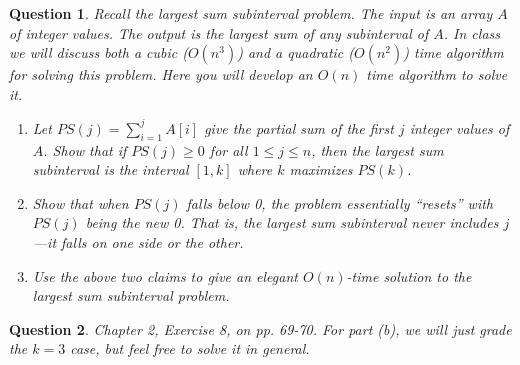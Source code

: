 \documentclass[11pt]{article}
\newtheorem{question}{Question}
\begin{document}
\begin{question}
Recall the {\em largest sum subinterval} problem.  The input is an array $A$ of integer values.  The output is the largest sum of any subinterval of $A$.  In class we will discuss both a cubic ($O(n^{3})$) and a quadratic ($O(n^{2})$) time algorithm for solving this problem.  Here you will develop an $O(n)$ time algorithm to solve it.
\begin{enumerate}
	\item Let $PS(j) = \sum_{i=1}^{j} A[i]$ give the partial sum of the first $j$ integer values of $A$.  Show that if $PS(j) \geq 0$ for all $1 \leq j \leq n$, then the largest sum subinterval is the interval $[1,k]$ where $k$ maximizes $PS(k)$.
	\item Show that when $PS(j)$ falls below 0, the problem essentially ``resets''  with $PS(j)$ being the new 0.  That is, the largest sum subinterval never includes $j$---it falls on one side or the other.
	\item Use the above two claims to give an elegant $O(n)$-time solution to the largest sum subinterval problem.
\end{enumerate}
\end{question}

\begin{question}
Chapter 2, Exercise 8, on pp. 69-70.  For part (b), we will just grade the $k=3$ case, but feel free to solve it in general.
\end{question}
\end{document}
